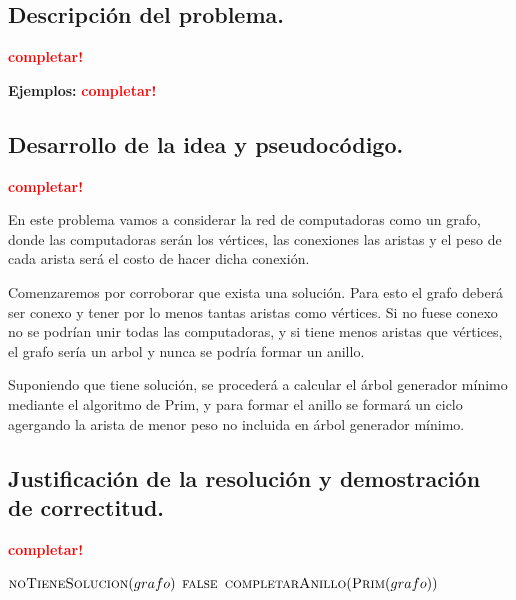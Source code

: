 \subsection{Descripción del problema.}

\vspace*{0.3cm}

\textcolor{red}{\textbf{completar!}}

\vspace*{0.5cm}

\textbf{Ejemplos:}
  \textcolor{red}{\textbf{completar!}}



\newpage
\subsection{Desarrollo de la idea y pseudocódigo.}

\vspace*{0.3cm}

\textcolor{red}{\textbf{completar!}}

En este problema vamos a considerar la red de computadoras como un grafo, donde
las computadoras serán los vértices, las conexiones las aristas y el peso de cada
arista será el costo de hacer dicha conexión.

Comenzaremos por corroborar que exista una solución. Para esto el grafo deberá 
ser conexo y tener por lo menos tantas aristas como vértices. Si no fuese conexo
no se podrían unir todas las computadoras, y si tiene menos aristas que vértices,
el grafo sería un arbol y nunca se podría formar un anillo.

Suponiendo que tiene solución, se procederá a calcular el árbol generador mínimo
mediante el algoritmo de Prim, y para formar el anillo se formará un ciclo agergando
la arista de menor peso no incluida en árbol generador mínimo.

\newpage
\subsection{Justificación de la resolución y demostración de correctitud.}

\vspace*{0.3cm}

\textcolor{red}{\textbf{completar!}}

\begin{codebox}
\li \If $\textnormal{\scshape noTieneSolucion}(grafo)$
\li     \Then
          \Return $\textnormal{\scshape false}$
        \End
\li  \Return $\textnormal{\scshape completarAnillo}(\textnormal{\scshape Prim}(grafo))$   
\end{codebox}

